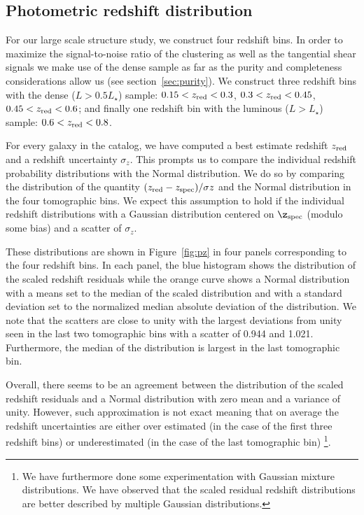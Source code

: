 \documentclass[fleqn,usenatbib,useAMS]{mnras}
\begin{document}
\subsection{Photometric redshift distribution}

For our large scale structure study, we construct four redshift bins. 
In order to maximize the signal-to-noise ratio of the clustering as well as the tangential shear signals we make use of the dense sample as far as the purity and completeness considerations allow us (see section~\ref{sec:purity}). We construct three redshift bins with the dense ($L > 0.5 L_{\star}$) sample: $0.15<z_{\rm red}<0.3$, $0.3<z_{\rm red}<0.45$, $0.45<z_{\rm red}<0.6$; and finally one redshift bin with the luminous ($L > L_{\star}$) sample: $0.6<z_{\rm red}<0.8$.

For every galaxy in the catalog, we have computed a best estimate redshift $z_{\rm red}$ and a redshift uncertainty $\sigma_z$. This prompts us to compare the individual redshift probability distributions with the Normal distribution. We do so by comparing the distribution of the quantity $(z_{\rm red} - z_{\rm spec})/\sigma{z}$ and the Normal distribution in the four tomographic bins. We expect this assumption to hold if the individual redshift distributions with a Gaussian distribution centered on $\z_{\rm spec}$ (modulo some bias) and a scatter of $\sigma_{z}$. 

These distributions are shown in Figure~\ref{fig:pz} in four panels corresponding to the four redshift bins. In each panel, the blue histogram shows the distribution of the scaled redshift residuals while the orange curve shows a Normal distribution with a means set to the median of the scaled distribution and with a standard deviation set to the normalized median absolute deviation of the distribution. We note that the scatters are close to unity with the largest deviations from unity seen in the last two tomographic bins with a scatter of 0.944 and 1.021. Furthermore, the median of the distribution is largest in the last tomographic bin.

Overall, there seems to be an agreement between the distribution of the scaled redshift residuals and a Normal distribution with zero mean and a variance of unity. However, such approximation is not exact meaning that on average the redshift uncertainties are either over estimated (in the case of the first three redshift bins) or underestimated (in the case of the last tomographic bin) \footnote{We have furthermore done some experimentation with Gaussian mixture distributions. We have observed that the scaled residual redshift distributions are better described by multiple Gaussian distributions.}. 
\end{document}
